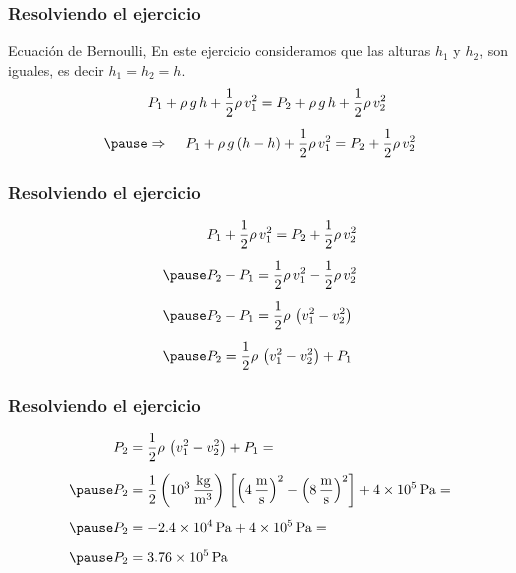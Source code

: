 \documentclass[14pt]{beamer}
\begin{document}
\begin{frame}
\frametitle{Resolviendo el ejercicio}
 Ecuación de Bernoulli, \pause En este ejercicio consideramos que las alturas $h_{1}$ y $h_{2}$, son iguales, es decir $h_{1} = h_{2} = h$.
\pause
\begin{eqnarray*}
\begin{aligned}
&P_{1} + \rho \, g \, h + \dfrac{1}{2} \rho \, v_{1}^{2} = P_{2} + \rho \, g \, h + \dfrac{1}{2} \rho \, v_{2}^{2} \\[0.5em] \pause
&\Rightarrow \hspace{0.4cm} P_{1} + \rho \, g \, (h - h) + \dfrac{1}{2} \rho \, v_{1}^{2} = P_{2} + \dfrac{1}{2} \rho \, v_{2}^{2}
\end{aligned}
\end{eqnarray*}
\end{frame}
\begin{frame}
\frametitle{Resolviendo el ejercicio}
\vspace*{-1cm}
\begin{eqnarray*}
\begin{aligned}
&P_{1} + \dfrac{1}{2} \rho \, v_{1}^{2} = P_{2} + \dfrac{1}{2} \rho \, v_{2}^{2} \\[0.5em] \pause
&P_{2} - P_{1} = \dfrac{1}{2} \rho \, v_{1}^{2} - \dfrac{1}{2} \rho \, v_{2}^{2} \\[0.5em] \pause
&P_{2} - P_{1} = \dfrac{1}{2} \rho \, \left( v_{1}^{2} - v_{2}^{2} \right) \\[0.5em] \pause
&P_{2} = \dfrac{1}{2} \rho \, \left( v_{1}^{2} - v_{2}^{2} \right) + P_{1}
\end{aligned}
\end{eqnarray*}
\end{frame}
\begin{frame}
\frametitle{Resolviendo el ejercicio}
\vspace*{-1cm}
\begin{eqnarray*}
\begin{aligned}
P_{2} &= \dfrac{1}{2} \rho \, \left( v_{1}^{2} - v_{2}^{2} \right) + P_{1} = \\[0.5em] \pause
P_{2} &= \dfrac{1}{2} \left( \SI[per-mode=fraction]{d3}{\kilo\gram\per\cubic\meter} \right) \, \left[ \left( \SI[per-mode=fraction]{4}{\meter\per\second} \right)^{2} - \left( \SI[per-mode=fraction]{8}{\meter\per\second} \right)^{2} \right] + \SI{4d5}{\pascal} =  \\[0.5em] \pause
P_{2} &= - \SI{2.4d4}{\pascal} + \SI{4d5}{\pascal} =  \\[0.5em] \pause
P_{2} &= \SI{3.76d5}{\pascal}
\end{aligned}
\end{eqnarray*}
\end{frame}
\end{document}
